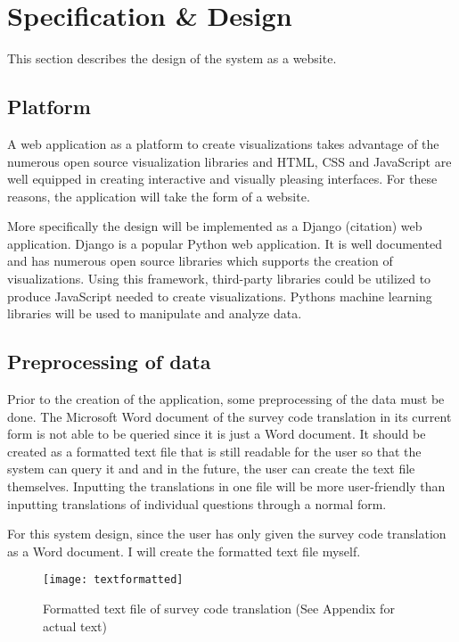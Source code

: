 \chapter{Specification \& Design} \label{ch:design}

This section describes the design of the system as a website.

\section{Platform}
A web application as a platform to create visualizations takes advantage of the numerous open source visualization libraries and HTML, CSS and JavaScript are well equipped in creating interactive and visually pleasing interfaces. For these reasons, the application will take the form of a website.\par

More specifically the design will be implemented as a Django (citation) web application. Django is a popular Python web application. It is well documented and has numerous open source libraries which supports the creation of visualizations. Using this framework, third-party libraries could be utilized to produce JavaScript needed to create visualizations. Python\textquotesingle s machine learning libraries will be used to manipulate and analyze data.

\section{Preprocessing of data} \label{preprocessing}
Prior to the creation of the application, some preprocessing of the data must be done. The Microsoft Word document of the survey code translation in its current form is not able to be queried since it is just a Word document. It should be created as a formatted text file that is still readable for the user so that the system can query it and and in the future, the user can create the text file themselves. Inputting the translations in one file will be more user-friendly than inputting translations of individual questions through a normal form.\par

For this system design, since the user has only given the survey code translation as a Word document. I will create the formatted text file myself.\par


\begin{figure}[h]
\centering
\texttt{[image: textformatted]}
\caption{Formatted text file of survey code translation (See Appendix for actual text)}
\end{figure}

